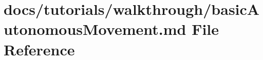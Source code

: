 \hypertarget{basicAutonomousMovement_8md}{}\section{docs/tutorials/walkthrough/basic\+Autonomous\+Movement.md File Reference}
\label{basicAutonomousMovement_8md}
